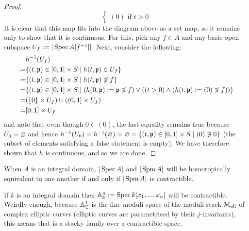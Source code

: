 \begin{proof}
$$\begin{cases}
                                \text{$(0)$ if $t > 0$}
                            \end{cases}
                        $$
                    It is clear that this map fits into the diagram above as a set map, so it remains only to show that it is continuous. For this, pick any $f \in A$ and any basic open subspace $U_f := |\operatorname{Spec} A[f^{-1}]|$. Next, consider the following:
                        $$
                            \begin{aligned}
                                & h^{-1}(U_f)
                                \\
                                := & \{ (t, \p) \in [0, 1] \x S \mid h(t, \p) \in U_f \}
                                \\
                                = & \{ (t, \p) \in [0, 1] \x S \mid h(t, \p) \not \ni f \}
                                \\
                                = & \{ (t, \p) \in [0, 1] \x S \mid \left( h(0, \p) := \p \not \ni f \right) \vee \left( (t > 0) \wedge ( h(t, \p) := (0) \not \ni f ) \right) \}
                                \\
                                = & (\{0\} \x U_f) \cup ((0, 1] \x U_f)
                                \\
                                = & [0, 1] \x U_f
                            \end{aligned}
                        $$
                    and note that even though $0 \in (0)$, the last equality remains true because $U_0 = \varnothing$ and hence $h^{-1}(U_0) = h^{-1}(\varnothing) = \varnothing = \{(t, \p) \in [0, 1] \x S \mid (0) \not \ni 0\}$ (the subset of elements satisfying a false statement is empty). We have therefore shown that $h$ is continuous, and so we are done.
                \end{proof}
            \begin{corollary}
                When $A$ is an integral domain, $|\operatorname{Spec} A|$ and $|\operatorname{Spm} A|$ will be homotopically equivalent to one another if and only if $|\operatorname{Spm} A|$ is contractible.
            \end{corollary}
            \begin{example}
                If $k$ is an integral domain then $\mathbb{A}^n_k := \operatorname{Spec} k[x_1, ..., x_n]$ will be contractible. Weirdly enough, because $\mathbb{A}^1_{\mathbb{C}}$ is the fine moduli space of the moduli stack $\mathcal{M}_{\mathrm{ell}}$ of complex elliptic curves (elliptic curves are parametrised by their $j$-invariants), this means that is a stacky family over a contractible space. 
            \end{example}
